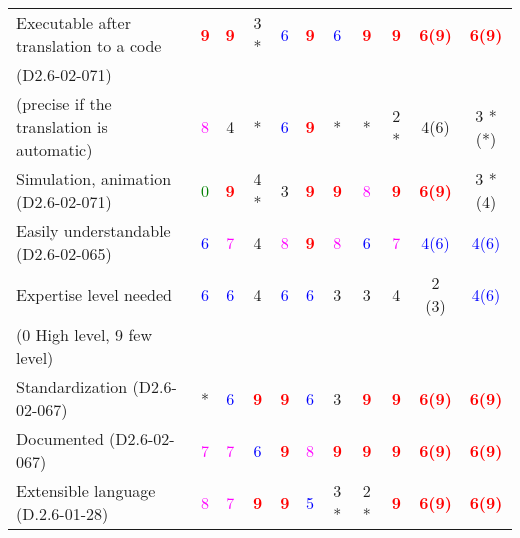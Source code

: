 \begin{tabular}{|l | c | c | c | c | c | c | c | c | c | c |}
\hline
Executable after translation to a code  & \textcolor{red}{\textbf{9}} & \textcolor{red}{\textbf{9}} & 3    * & \textcolor{blue}{6} & \textcolor{red}{\textbf{9}} & \textcolor{blue}{6} & \textcolor{red}{\textbf{9}} & \textcolor{red}{\textbf{9}} & \textcolor{red}{\textbf{6(9)}}  & \textcolor{red}{\textbf{6(9)}}   \\
(D2.6-02-071)  &  &      &  &  & & &  &    &   &   \\
(precise if the translation is automatic)  & \textcolor{magenta}{8} & 4  &  * & \textcolor{blue}{6} & \textcolor{red}{\textbf{9}} & * & * & 2    * &  4(6) & 3 *(*) \\
\hline
Simulation, animation (D2.6-02-071)  & \textcolor{green}{0} & \textcolor{red}{\textbf{9}} & 4    * & 3     & \textcolor{red}{\textbf{9}} & \textcolor{red}{\textbf{9}} & \textcolor{magenta}{8} & \textcolor{red}{\textbf{9}} & \textcolor{red}{\textbf{6(9)}}  & 3 *(4) \\
\hline
Easily understandable (D2.6-02-065)  & \textcolor{blue}{6} & \textcolor{magenta}{7} & 4     & \textcolor{magenta}{8} & \textcolor{red}{\textbf{9}} & \textcolor{magenta}{8}  & \textcolor{blue}{6} & \textcolor{magenta}{7} & \textcolor{blue}{4(6)}  & \textcolor{blue}{4(6)}  \\
\hline
Expertise level needed  & \textcolor{blue}{6} & \textcolor{blue}{6} & 4     & \textcolor{blue}{6} & \textcolor{blue}{6} & 3     & 3     & 4     & 2 (3) & \textcolor{blue}{4(6)}  \\
(0 High level, 9 few level)   &  &      &  &  & & &  &    &   &   \\
\hline
Standardization (D2.6-02-067)  & * & \textcolor{blue}{6} & \textcolor{red}{\textbf{9}} & \textcolor{red}{\textbf{9}} & \textcolor{blue}{6} & 3     & \textcolor{red}{\textbf{9}} & \textcolor{red}{\textbf{9}} & \textcolor{red}{\textbf{6(9)}}  & \textcolor{red}{\textbf{6(9)}}  \\
\hline
Documented (D2.6-02-067)  & \textcolor{magenta}{7} & \textcolor{magenta}{7} & \textcolor{blue}{6} & \textcolor{red}{\textbf{9}} & \textcolor{magenta}{8} & \textcolor{red}{\textbf{9}} & \textcolor{red}{\textbf{9}} & \textcolor{red}{\textbf{9}} & \textcolor{red}{\textbf{6(9)}}  & \textcolor{red}{\textbf{6(9)}}  \\
\hline
Extensible language (D.2.6-01-28)  & \textcolor{magenta}{8} & \textcolor{magenta}{7} & \textcolor{red}{\textbf{9}} & \textcolor{red}{\textbf{9}} & \textcolor{blue}{5} & 3    * & 2    * & \textcolor{red}{\textbf{9}} & \textcolor{red}{\textbf{6(9)}}   & \textcolor{red}{\textbf{6(9)}}  \\
\hline
\end{tabular}


